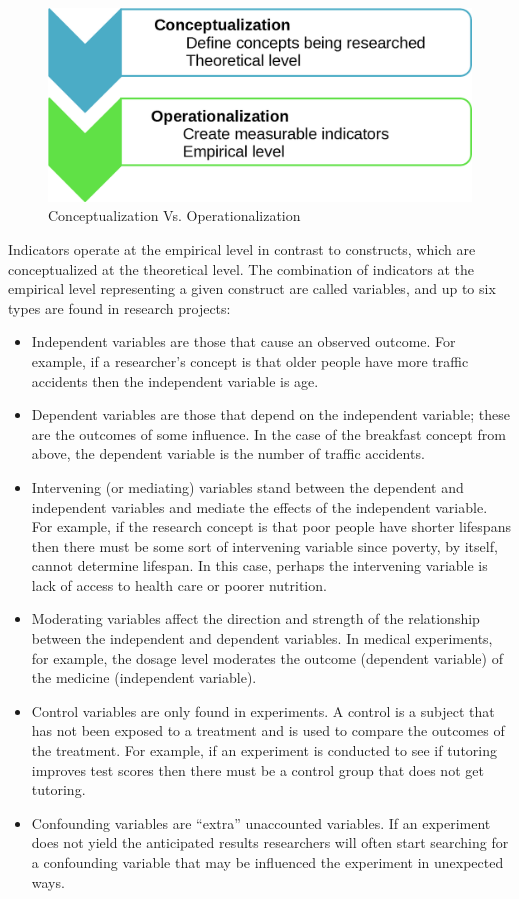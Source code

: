 \begin{figure}[H]
	\centering
	\includegraphics[width=\maxwidth{.95\linewidth}]{gfx/05-ConceptVsOper}
	\caption{Conceptualization Vs. Operationalization}
	\label{05:fig02}
\end{figure}

Indicators operate at the empirical level in contrast to constructs, which are conceptualized at the theoretical level. The combination of indicators at the empirical level representing a given construct are called \glspl{variable}, and up to six types are found in research projects:

\begin{itemize}
	\item Independent variables are those that cause an observed outcome. For example, if a researcher's concept is that older people have more traffic accidents then the independent variable is age.
	\item Dependent variables are those that depend on the independent variable; these are the outcomes of some influence. In the case of the breakfast concept from above, the dependent variable is the number of traffic accidents.
	\item Intervening (or mediating) variables stand between the dependent and independent variables and mediate the effects of the independent variable. For example, if the research concept is that poor people have shorter lifespans then there must be some sort of intervening variable since poverty, by itself, cannot determine lifespan. In this case, perhaps the intervening variable is lack of access to health care or poorer nutrition.
	\item Moderating variables affect the direction and strength of the relationship between the independent and dependent variables. In medical experiments, for example, the dosage level moderates the outcome (dependent variable) of the medicine (independent variable). 
	\item Control variables are only found in experiments. A control is a subject that has not been exposed to a treatment and is used to compare the outcomes of the treatment. For example, if an experiment is conducted to see if tutoring improves test scores then there must be a control group that does not get tutoring.
	\item Confounding variables are ``extra'' unaccounted variables. If an experiment does not yield the anticipated results researchers will often start searching for a confounding variable that may be influenced the experiment in unexpected ways.
\end{itemize}


